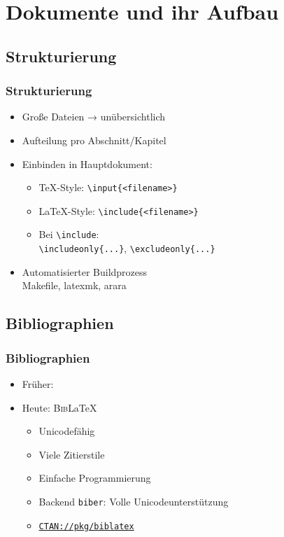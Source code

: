 \section{Dokumente und ihr Aufbau}

\subsection{Strukturierung}
\begin{frame}
  \frametitle{Strukturierung}
  \begin{itemize}
  \item Große Dateien → unübersichtlich
  \item Aufteilung pro Abschnitt/Kapitel
  \item Einbinden in Hauptdokument:
    \begin{itemize}
    \item \TeX-Style: \texttt{\textbackslash input\{<filename>\}}
    \item \LaTeX-Style: \texttt{\textbackslash include\{<filename>\}}
    \item Bei \texttt{\textbackslash include}:\\
      \texttt{\textbackslash includeonly\{...\}},
      \texttt{\textbackslash excludeonly\{...\}}
    \end{itemize}
  \item Automatisierter Buildprozess\\
    Makefile, latexmk, arara
  \end{itemize}
\end{frame}

\subsection{Bibliographien}
\begin{frame}
  \frametitle{Bibliographien}
  \begin{itemize}
  \item Früher: 
  \item Heute: \alert{\textsc{Bib}\LaTeX}
    \begin{itemize}
    \item Unicodefähig
    \item Viele Zitierstile
    \item Einfache Programmierung
    \item Backend \texttt{biber}: Volle Unicodeunterstützung
    \item \href{http://ctan.org/pkg/biblatex}{\texttt{CTAN://pkg/biblatex}}
    \end{itemize}
  \end{itemize}
\end{frame}

